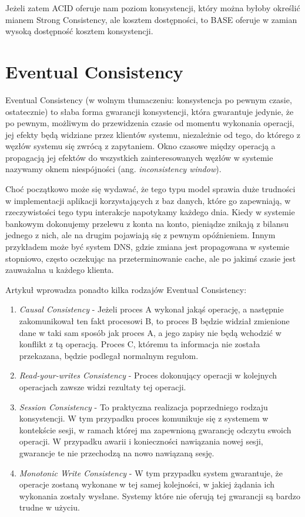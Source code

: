 Jeżeli zatem ACID oferuje nam poziom konsystencji, który można byłoby określić mianem Strong Consistency, ale kosztem dostępności, to BASE oferuje w zamian wysoką dostępność kosztem konsystencji. 

\section{Eventual Consistency}

Eventual Consistency (w wolnym tłumaczeniu: konsystencja po pewnym czasie, ostatecznie) to słaba forma gwarancji konsystencji, która gwarantuje jedynie, że po pewnym, możliwym do przewidzenia czasie od momentu wykonania operacji, jej efekty będą widziane przez klientów systemu, niezależnie od tego, do którego z węzłów systemu się zwrócą z zapytaniem.
Okno czasowe między operacją a propagacją jej efektów do wszystkich zainteresowanych węzłów w systemie nazywamy oknem niespójności (ang. \emph{inconsistency window}).

Choć początkowo może się wydawać, że tego typu model sprawia duże trudności w implementacji aplikacji korzystających z baz danych, które go zapewniają, w rzeczywistości tego typu interakcje napotykamy każdego dnia.
Kiedy w systemie bankowym dokonujemy przelewu z konta na konto, pieniądze znikają z bilansu jednego z nich, ale na drugim pojawiają się z pewnym opóźnieniem.
Innym przykładem może być system DNS, gdzie zmiana jest propagowana w systemie stopniowo, często oczekując na przeterminowanie cache, ale po jakimś czasie jest zauważalna u każdego klienta.

Artykuł \cite{vogels-eventually-consistent} wprowadza ponadto kilka rodzajów Eventual Consistency:

\begin{enumerate}
 \item \emph{Causal Consistency} - Jeżeli proces A wykonał jakąś operację, a następnie zakomunikował ten fakt procesowi B, to proces B będzie widział zmienione dane w taki sam sposób jak proces A, a jego zapisy nie będą wchodzić w konflikt z tą operacją.
 Proces C, któremu ta informacja nie została przekazana, będzie podlegał normalnym regułom.
 \item \emph{Read-your-writes Consistency} - Proces dokonujący operacji w kolejnych operacjach zawsze widzi rezultaty tej operacji.
 \item \emph{Session Consistency} - To praktyczna realizacja poprzedniego rodzaju konsystencji.
 W tym przypadku proces komunikuje się z systemem w kontekście sesji, w ramach której ma zapewnioną gwarancję odczytu swoich operacji.
 W przypadku awarii i konieczności nawiązania nowej sesji, gwarancje te nie przechodzą na nowo nawiązaną sesję.
 \item \emph{Monotonic Write Consistency} - W tym przypadku system gwarantuje, że operacje zostaną wykonane w tej samej kolejności, w jakiej żądania ich wykonania zostały wysłane.
 Systemy które nie oferują tej gwarancji są bardzo trudne w użyciu.
\end{enumerate}

